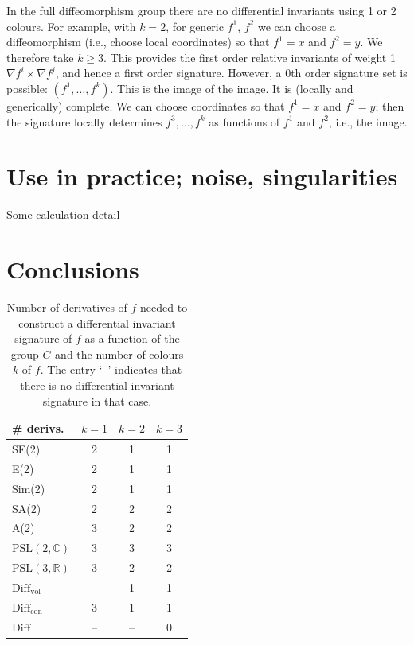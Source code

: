 \documentclass[review,onefignum,onetabnum]{siamonline190516}
\def\R{\mathbb{R}}
\begin{document}
{In the full diffeomorphism group there are no differential invariants using 1 or 2 colours. For example, with $k=2$, for generic $f^1$, $f^2$ we can choose a diffeomorphism (i.e., choose local coordinates) so that $f^1=x$ and $f^2=y$. We therefore take $k\ge 3$. This provides the first order relative invariants of weight 1 $\nabla f^i\times \nabla f^j$, and hence a first order signature. However, a 0th order signature set is possible: $(f^1,\dots,f^k)$. This is the image of the image. It is (locally and generically) complete. We can choose coordinates so that $f^1=x$ and $f^2=y$; then the signature locally determines $f^3,\dots,f^k$ as functions of $f^1$ and $f^2$, i.e., the image.

\section{Use in practice; noise, singularities}

Some calculation detail


\section{Conclusions}


\begin{table}[h]
\begin{center}
\begin{tabular}{| l | c c c |}
\hline
\# derivs. & $k=1$ & $k=2$ & $k=3$ \\
\hline
SE(2) & 2 &1 & 1 \\
E(2) & 2 & 1 & 1 \\
Sim(2) & 2 & 1 & 1 \\
SA(2) & 2 & 2 & 2 \\
A(2) & 3 & 2 & 2 \\
$\mathrm{PSL}(2,\mathbb{C})$ & 3 & 3 & 3 \\
$\mathrm{PSL}(3,\R)$ & 3 & 2 & 2 \\
$\mathrm{Diff}_{\mathrm{vol}}$ & -- & 1 & 1 \\
$\mathrm{Diff}_{\mathrm{con}}$ & 3 & 1 & 1 \\
$\mathrm{Diff}$ & -- & -- & 0 \\
\hline
\end{tabular}
\caption{Number of derivatives of $f$ needed to construct a differential invariant signature of $f$ as a function of the group $G$ and the number of colours $k$ of $f$. The entry `--' indicates that there is no differential invariant signature in that case.}
\end{center}
\end{table}

}
\end{document}
